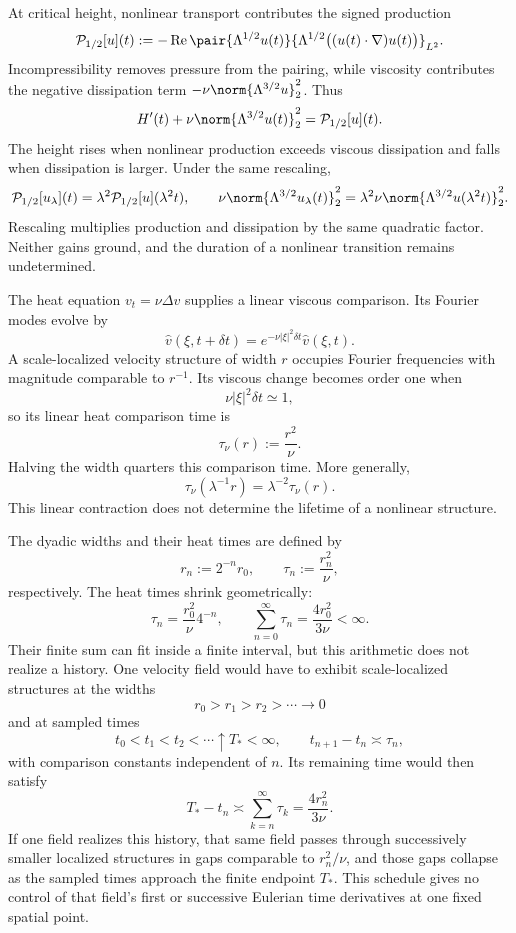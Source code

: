
At critical height, nonlinear transport contributes the signed production
\[
  \mathcal P_{1/2}[u](t)
  :=
  -\operatorname{Re}
  \pair
    {\Lambda^{1/2}u(t)}
    {\Lambda^{1/2}\bigl((u(t)\cdot\nabla)u(t)\bigr)}_{L^2}.
\]
Incompressibility removes pressure from the pairing, while viscosity contributes the negative dissipation term \(-\nu\norm{\Lambda^{3/2}u}_2^2\). Thus
\[
  H'(t)
  +
  \nu\norm{\Lambda^{3/2}u(t)}_2^2
  =
  \mathcal P_{1/2}[u](t).
\]
The height rises when nonlinear production exceeds viscous dissipation and falls when dissipation is larger. Under the same rescaling,
\[
  \mathcal P_{1/2}[u_\lambda](t)
  =
  \lambda^2\mathcal P_{1/2}[u](\lambda^2t),
  \qquad
  \nu\norm{\Lambda^{3/2}u_\lambda(t)}_2^2
  =
  \lambda^2\nu\norm{\Lambda^{3/2}u(\lambda^2t)}_2^2.
\]
Rescaling multiplies production and dissipation by the same quadratic factor. Neither gains ground, and the duration of a nonlinear transition remains undetermined.


The heat equation \(v_t=\nu\Delta v\) supplies a linear viscous comparison. Its Fourier modes evolve by
\[
  \widehat v(\xi,t+\delta t)
  =
  e^{-\nu|\xi|^2\delta t}\widehat v(\xi,t).
\]
A scale-localized velocity structure of width \(r\) occupies Fourier frequencies with magnitude comparable to \(r^{-1}\). Its viscous change becomes order one when
\[
  \nu|\xi|^2\delta t\simeq1,
\]
so its linear heat comparison time is
\[
  \tau_\nu(r)
  :=
  \frac{r^2}{\nu}.
\]
Halving the width quarters this comparison time. More generally,
\[
  \tau_\nu(\lambda^{-1}r)
  =
  \lambda^{-2}\tau_\nu(r).
\]
This linear contraction does not determine the lifetime of a nonlinear structure.


The dyadic widths and their heat times are defined by
\[
  r_n:=2^{-n}r_0,
  \qquad
  \tau_n:=\frac{r_n^2}{\nu},
\]
respectively. The heat times shrink geometrically:
\[
  \tau_n
  =
  \frac{r_0^2}{\nu}4^{-n},
  \qquad
  \sum_{n=0}^{\infty}\tau_n
  =
  \frac{4r_0^2}{3\nu}
  <
  \infty.
\]
Their finite sum can fit inside a finite interval, but this arithmetic does not realize a \NavierStokes{} history. One velocity field would have to exhibit scale-localized structures at the widths
\[
  r_0>r_1>r_2>\cdots\longrightarrow0
\]
and at sampled times
\[
  t_0<t_1<t_2<\cdots\uparrow T_*<\infty,
  \qquad
  t_{n+1}-t_n\asymp\tau_n,
\]
with comparison constants independent of \(n\). Its remaining time would then satisfy
\[
  T_*-t_n
  \asymp
  \sum_{k=n}^{\infty}\tau_k
  =
  \frac{4r_n^2}{3\nu}.
\]
If one field realizes this history, that same field passes through successively smaller localized structures in gaps comparable to \(r_n^2/\nu\), and those gaps collapse as the sampled times approach the finite endpoint \(T_*\). This schedule gives no control of that field's first or successive Eulerian time derivatives at one fixed spatial point.
